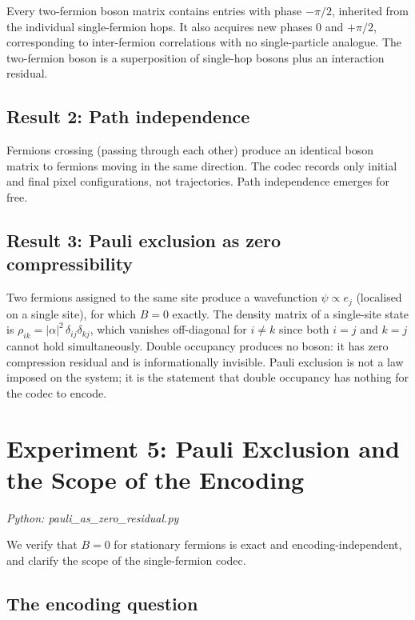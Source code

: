 \documentclass[11pt]{article}
\begin{document}
Every two-fermion boson matrix contains entries with phase $-\pi/2$,
inherited from the individual single-fermion hops.
It also acquires new phases $0$ and $+\pi/2$, corresponding to
inter-fermion correlations with no single-particle analogue.
The two-fermion boson is a superposition of single-hop bosons plus an
interaction residual.

\subsection*{Result 2: Path independence}

Fermions crossing (passing through each other) produce an identical boson
matrix to fermions moving in the same direction.
The codec records only initial and final pixel configurations, not
trajectories.
Path independence emerges for free.

\subsection*{Result 3: Pauli exclusion as zero compressibility}

Two fermions assigned to the same site produce a wavefunction $\psi \propto e_j$
(localised on a single site), for which $B = 0$ exactly.
The density matrix of a single-site state is
$\rho_{ik} = |\alpha|^2\,\delta_{ij}\delta_{kj}$,
which vanishes off-diagonal for $i \neq k$ since both $i = j$ and $k = j$
cannot hold simultaneously.
Double occupancy produces no boson: it has zero compression residual and is
informationally invisible.
Pauli exclusion is not a law imposed on the system; it is the statement that
double occupancy has nothing for the codec to encode.

\section{Experiment 5: Pauli Exclusion and the Scope of the Encoding}
\label{sec:exp5}

\textit{Python: pauli\_as\_zero\_residual.py}

We verify that $B = 0$ for stationary fermions is exact and encoding-independent,
and clarify the scope of the single-fermion codec.

\subsection*{The encoding question}
\end{document}
